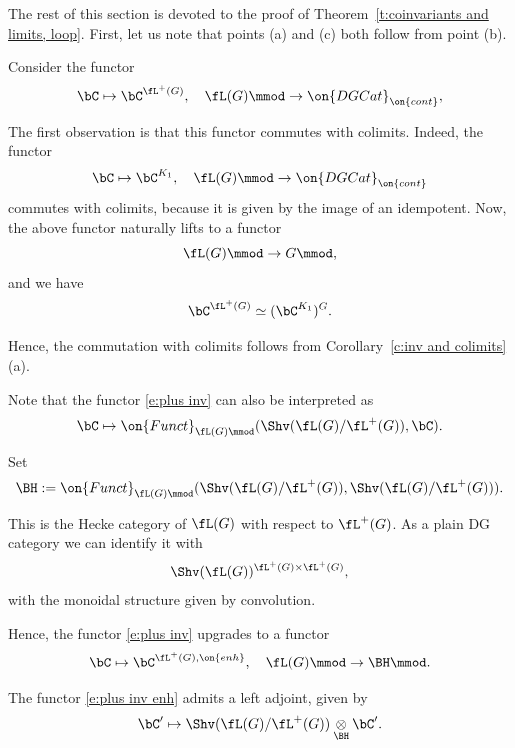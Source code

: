 \documentclass[9pt]{amsart}
\theoremstyle{definition}
\theoremstyle{remark}
\newtheorem{rem}[subsubsection]{Remark}
\newcommand{\thmref}[1]{Theorem~\ref{#1}}
\newcommand{\corref}[1]{Corollary~\ref{#1}}
\numberwithin{equation}{section}
\begin{document}
The rest of this section is devoted to the proof of \thmref{t:coinvariants and limits, loop}. First, let us note
that points (a) and (c) both follow from point (b). 

\ssec{Proof of \thmref{t:coinvariants and limits, loop}}   \label{ss:proof in loop}

\sssec{}

Consider the functor
\begin{equation} \label{e:plus inv}
\bC\mapsto \bC^{\fL^+(G)}, \quad \fL(G)\mmod\to \on{DGCat}_{\on{cont}},
\end{equation} 

The first observation is that this functor commutes with colimits. Indeed, the functor
$$\bC\mapsto \bC^{K_1},\quad \fL(G)\mmod\to \on{DGCat}_{\on{cont}}$$
commutes with colimits, because it is given by the image of an idempotent. Now, 
the above functor naturally lifts to a functor
$$\fL(G)\mmod\to G\mmod,$$
and we have 
$$\bC^{\fL^+(G)}\simeq (\bC^{K_1})^G.$$

Hence, the commutation with colimits follows from \corref{c:inv and colimits}(a). 

\sssec{}

Note that the functor \eqref{e:plus inv} can also be interpreted as 
$$\bC\mapsto \on{Funct}_{\fL(G)\mmod}(\Shv(\fL(G)/\fL^+(G)),\bC).$$

Set
$$\BH:=\on{Funct}_{\fL(G)\mmod}(\Shv(\fL(G)/\fL^+(G)),\Shv(\fL(G)/\fL^+(G))).$$

This is the Hecke category of $\fL(G)$ with respect to $\fL^+(G)$. As a plain DG category we can identify it with
$$\Shv(\fL(G))^{\fL^+(G)\times \fL^+(G)},$$
with the monoidal structure given by convolution.

\medskip

Hence, the functor \eqref{e:plus inv} upgrades to a functor
\begin{equation} \label{e:plus inv enh}
\bC\mapsto \bC^{\fL^+(G),\on{enh}}, \quad  \fL(G)\mmod\to\BH\mmod.
\end{equation} 


\sssec{}

The functor \eqref{e:plus inv enh} admits a left adjoint, given by 
\begin{equation} \label{e:tensor up from Hecke}
\bC'\mapsto \Shv(\fL(G)/\fL^+(G))\underset{\BH}\otimes \bC'.
\end{equation}
\end{document}
